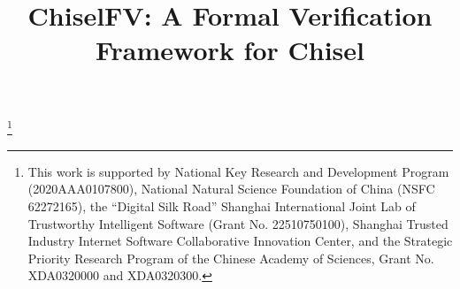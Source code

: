 \documentclass[conference]{IEEEtran}
\theoremstyle{definition}
\newcommand\blfootnote[1]{%
  \begingroup
  \renewcommand\thefootnote{}\footnote{#1}%
  \addtocounter{footnote}{-1}%
  \endgroup
}
\begin{document}
\title{ChiselFV: A Formal Verification Framework for Chisel
}


\author{
  
}

\maketitle

\blfootnote{
    This work is supported by National Key Research and Development Program (2020AAA0107800), National Natural Science Foundation of China (NSFC 62272165), the “Digital Silk Road” Shanghai International Joint Lab of Trustworthy Intelligent Software (Grant No. 22510750100), Shanghai Trusted Industry Internet Software Collaborative Innovation Center, and the Strategic Priority Research Program of the Chinese Academy of Sciences, Grant No. XDA0320000 and XDA0320300.
}
\end{document}

